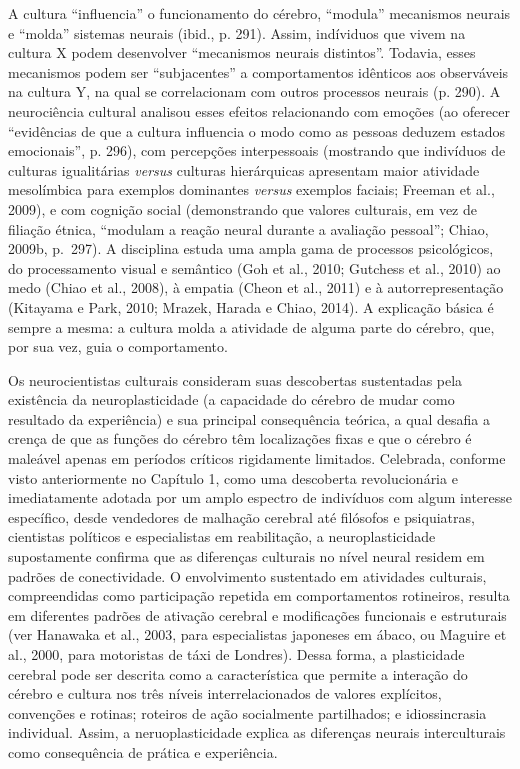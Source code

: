 A cultura ``influencia'' o funcionamento do cérebro, ``modula''
mecanismos neurais e ``molda'' sistemas neurais (ibid., p. 291). Assim,
indíviduos que vivem na cultura X podem desenvolver ``mecanismos neurais
distintos''. Todavia, esses mecanismos podem ser ``subjacentes'' a
comportamentos idênticos aos observáveis na cultura Y, na qual se
correlacionam com outros processos neurais (p. 290). A neurociência
cultural analisou esses efeitos relacionando com emoções (ao oferecer
``evidências de que a cultura influencia o modo como as pessoas deduzem
estados emocionais'', p. 296), com percepções interpessoais (mostrando
que indivíduos de culturas igualitárias \emph{versus} culturas
hierárquicas apresentam maior atividade mesolímbica para exemplos
dominantes \emph{versus} exemplos faciais; Freeman et al., 2009), e com
cognição social (demonstrando que valores culturais, em vez de filiação
étnica, ``modulam a reação neural durante a avaliação pessoal''; Chiao,
2009b, p.~297). A disciplina estuda uma ampla gama de processos
psicológicos, do processamento visual e semântico (Goh et al., 2010;
Gutchess et al., 2010) ao medo (Chiao et al., 2008), à empatia (Cheon et
al., 2011) e à autorrepresentação (Kitayama e Park, 2010; Mrazek, Harada
e Chiao, 2014). A explicação básica é sempre a mesma: a cultura molda a
atividade de alguma parte do cérebro, que, por sua vez, guia o
comportamento.

Os neurocientistas culturais consideram suas descobertas sustentadas
pela existência da neuroplasticidade (a capacidade do cérebro de mudar
como resultado da experiência) e sua principal consequência teórica, a
qual desafia a crença de que as funções do cérebro têm localizações
fixas e que o cérebro é maleável apenas em períodos críticos rigidamente
limitados. Celebrada, conforme visto anteriormente no Capítulo 1, como
uma descoberta revolucionária e imediatamente adotada por um amplo
espectro de indivíduos com algum interesse específico, desde vendedores
de malhação cerebral até filósofos e psiquiatras, cientistas políticos e
especialistas em reabilitação, a neuroplasticidade supostamente confirma
que as diferenças culturais no nível neural residem em padrões de
conectividade. O envolvimento sustentado em atividades culturais,
compreendidas como participação repetida em comportamentos rotineiros,
resulta em diferentes padrões de ativação cerebral e modificações
funcionais e estruturais (ver Hanawaka et al., 2003, para especialistas
japoneses em ábaco, ou Maguire et al., 2000, para motoristas de táxi de
Londres). Dessa forma, a plasticidade cerebral pode ser descrita como a
característica que permite a interação do cérebro e cultura nos três
níveis interrelacionados de valores explícitos, convenções e rotinas;
roteiros de ação socialmente partilhados; e idiossincrasia individual.
Assim, a neruoplasticidade explica as diferenças neurais interculturais
como consequência de prática e experiência.

